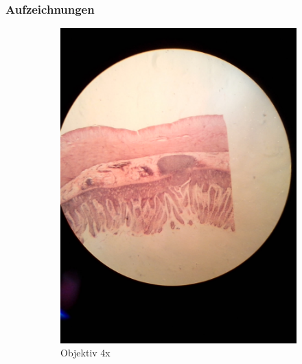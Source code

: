 \subsubsection{Aufzeichnungen}
\begin{figure}[h!]
	\centering
	\begin{subfigure}[b]{0.3\textwidth}
		\includegraphics[width=1\textwidth]{../images/01_mammal_illeum.jpg}
		\caption{Objektiv 4x}
	\end{subfigure}
	\begin{subfigure}[b]{0.3\textwidth}

\end{subfigure}
\end{figure}
